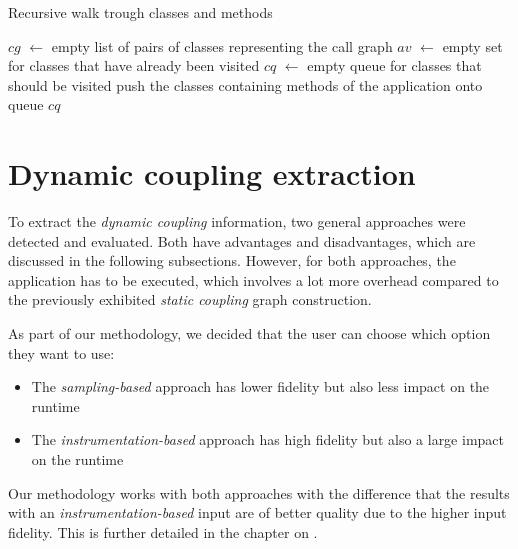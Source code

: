 \documentclass[12pt,a4paper]{report}
\begin{document}
\begin{algorithm}[ht]
\caption{Recursive walk trough classes and methods}
\label{algo:class-walk}
  \BlankLine
  \BlankLine
  $cg$ $\leftarrow$ empty list of pairs of classes representing the call graph\;
  $av$ $\leftarrow$ empty set for classes that have already been visited\;
  $cq$ $\leftarrow$ empty queue for classes that should be visited\;
  \BlankLine
  push the classes containing  methods of the application onto queue $cq$\;
  \BlankLine
  \BlankLine
  \;
\end{algorithm}



\section{Dynamic coupling extraction} \label{sect:dynamic-coupling-extraction}

To extract the \textit{dynamic coupling} information, two general approaches
were detected and evaluated. Both have advantages and disadvantages, which are
discussed in the following subsections. However, for both approaches, the
application has to be executed, which involves a lot more overhead compared to
the previously exhibited \textit{static coupling} graph construction.

As part of our methodology, we decided that the user can choose which option
they want to use:
\begin{itemize}[noitemsep]
  \item The \textit{sampling\hyp based} approach has lower fidelity but
        also less impact on the runtime
  \item The \textit{instrumentation\hyp based} approach has high fidelity but
        also a large impact on the runtime
\end{itemize}
Our methodology works with
both approaches with the difference that the results with an
\textit{instrumentation\hyp based} input are of better quality due to
the higher input fidelity. This is further detailed in the chapter on
\textit{}.
\end{document}
